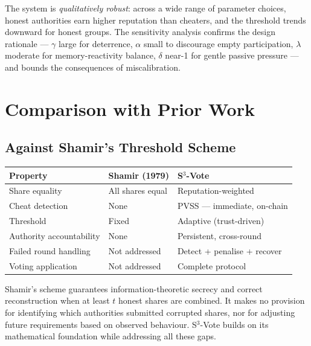 \documentclass[12pt,a4paper]{article}
\theoremstyle{definition}
\theoremstyle{remark}
\begin{document}
The system is \emph{qualitatively robust}: across a wide range of
parameter choices, honest authorities earn higher reputation than
cheaters, and the threshold trends downward for honest groups.
The sensitivity analysis confirms the design rationale — $\gamma$ large
for deterrence, $\alpha$ small to discourage empty participation,
$\lambda$ moderate for memory-reactivity balance, $\delta$ near-1 for
gentle passive pressure — and bounds the consequences of miscalibration.

\section{Comparison with Prior Work}
\label{sec:comparison}

\subsection{Against Shamir's Threshold Scheme}

\begin{center}
\begin{tabular}{p{4.5cm}p{4.5cm}p{4.5cm}}
\toprule
\textbf{Property} & \textbf{Shamir (1979)} & \textbf{S$^3$-Vote} \\
\midrule
Share equality & All shares equal & Reputation-weighted \\
Cheat detection & None & PVSS — immediate, on-chain \\
Threshold & Fixed & Adaptive (trust-driven) \\
Authority accountability & None & Persistent, cross-round \\
Failed round handling & Not addressed & Detect + penalise + recover \\
Voting application & Not addressed & Complete protocol \\
\bottomrule
\end{tabular}
\end{center}

Shamir's scheme guarantees information-theoretic secrecy and correct
reconstruction when at least $t$ honest shares are combined.
It makes no provision for identifying which authorities submitted
corrupted shares, nor for adjusting future requirements based on
observed behaviour. S$^3$-Vote builds on its mathematical foundation
while addressing all these gaps.
\end{document}
